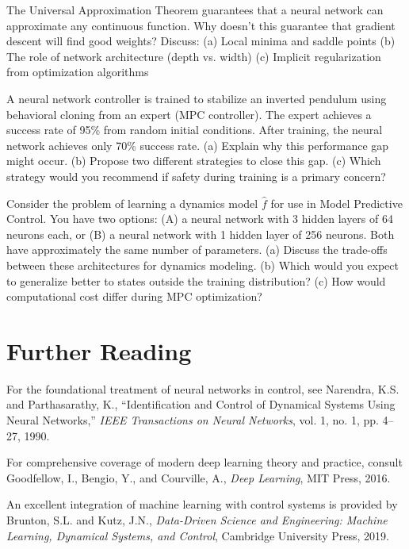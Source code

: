 \begin{exercise}
The Universal Approximation Theorem guarantees that a neural network can approximate any continuous function. Why doesn't this guarantee that gradient descent will find good weights? Discuss:
(a) Local minima and saddle points
(b) The role of network architecture (depth vs. width)
(c) Implicit regularization from optimization algorithms
\end{exercise}

\begin{exercise}
A neural network controller is trained to stabilize an inverted pendulum using behavioral cloning from an expert (MPC controller). The expert achieves a success rate of 95\% from random initial conditions. After training, the neural network achieves only 70\% success rate. (a) Explain why this performance gap might occur. (b) Propose two different strategies to close this gap. (c) Which strategy would you recommend if safety during training is a primary concern?
\end{exercise}

\begin{exercise}
Consider the problem of learning a dynamics model $\hat{f}$ for use in Model Predictive Control. You have two options: (A) a neural network with 3 hidden layers of 64 neurons each, or (B) a neural network with 1 hidden layer of 256 neurons. Both have approximately the same number of parameters. (a) Discuss the trade-offs between these architectures for dynamics modeling. (b) Which would you expect to generalize better to states outside the training distribution? (c) How would computational cost differ during MPC optimization?
\end{exercise}


\section{Further Reading}

For the foundational treatment of neural networks in control, see Narendra, K.S. and Parthasarathy, K., ``Identification and Control of Dynamical Systems Using Neural Networks,'' \textit{IEEE Transactions on Neural Networks}, vol. 1, no. 1, pp. 4--27, 1990.

For comprehensive coverage of modern deep learning theory and practice, consult Goodfellow, I., Bengio, Y., and Courville, A., \textit{Deep Learning}, MIT Press, 2016.

An excellent integration of machine learning with control systems is provided by Brunton, S.L. and Kutz, J.N., \textit{Data-Driven Science and Engineering: Machine Learning, Dynamical Systems, and Control}, Cambridge University Press, 2019.

